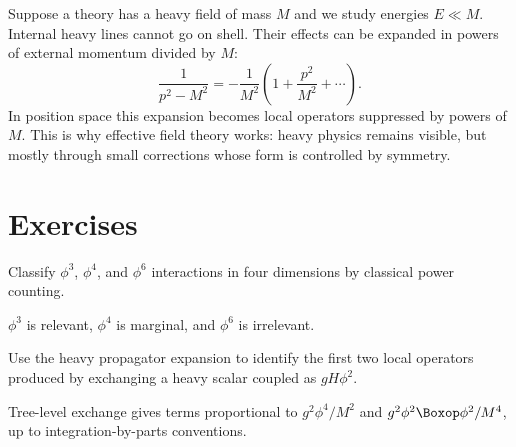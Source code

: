 Suppose a theory has a heavy field of mass \(M\) and we study energies \(E\ll M\).  Internal heavy lines cannot go on shell.  Their effects can be expanded in powers of external momentum divided by \(M\):
\[
  \frac1{p^2-M^2}
  =
  -\frac1{M^2}\left(1+\frac{p^2}{M^2}+\cdots\right).
\]
In position space this expansion becomes local operators suppressed by powers of \(M\).  This is why effective field theory works: heavy physics remains visible, but mostly through small corrections whose form is controlled by symmetry.

\section*{Exercises}

\begin{exercise}
Classify \(\phi^3\), \(\phi^4\), and \(\phi^6\) interactions in four dimensions by classical power counting.
\begin{answer}
\(\phi^3\) is relevant, \(\phi^4\) is marginal, and \(\phi^6\) is irrelevant.
\end{answer}
\end{exercise}

\begin{exercise}
Use the heavy propagator expansion to identify the first two local operators produced by exchanging a heavy scalar coupled as \(gH\phi^2\).
\begin{answer}
Tree-level exchange gives terms proportional to \(g^2\phi^4/M^2\) and \(g^2\phi^2\Boxop\phi^2/M^4\), up to integration-by-parts conventions.
\end{answer}
\end{exercise}

